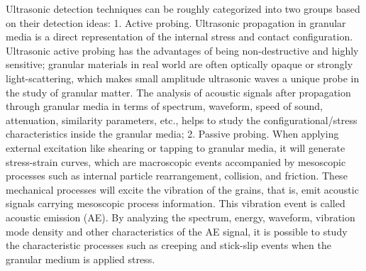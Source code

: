 \begin{digest}
    Ultrasonic detection techniques can be roughly categorized into two groups based on their detection ideas: 
    1. Active probing. Ultrasonic propagation in granular media is a direct representation of the internal stress and contact configuration. Ultrasonic active probing has the advantages of being non-destructive and highly sensitive; granular materials in real world are often optically opaque or strongly light-scattering, which makes small amplitude ultrasonic waves a unique probe in the study of granular matter.
    The analysis of acoustic signals after propagation through granular media in terms of spectrum, waveform, speed of sound, attenuation, similarity parameters, etc., helps to study the configurational/stress characteristics inside the granular media;
    2. Passive probing. When applying external excitation like shearing or tapping to granular media, it will generate stress-strain curves, which are macroscopic events accompanied by mesoscopic processes such as internal particle rearrangement, collision, and friction. These mechanical processes will excite the vibration of the grains, that is, emit acoustic signals carrying mesoscopic process information. This vibration event is called acoustic emission (AE).
    By analyzing the spectrum, energy, waveform, vibration mode density and other characteristics of the AE signal, it is possible to study the characteristic processes such as creeping and stick-slip events when the granular medium is applied stress.
    


\end{digest}
